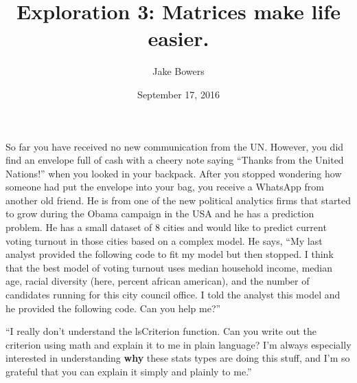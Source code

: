 \documentclass[10pt,]{article}
\title{Exploration 3: Matrices make life easier.}
\author{Jake Bowers}
\date{September 17, 2016}
\newenvironment{Shaded}{\begin{snugshade}}{\end{snugshade}}
\newcommand{\KeywordTok}[1]{\textcolor[rgb]{0.13,0.29,0.53}{\textbf{{#1}}}}
\newcommand{\DataTypeTok}[1]{\textcolor[rgb]{0.13,0.29,0.53}{{#1}}}
\newcommand{\DecValTok}[1]{\textcolor[rgb]{0.00,0.00,0.81}{{#1}}}
\newcommand{\StringTok}[1]{\textcolor[rgb]{0.31,0.60,0.02}{{#1}}}
\newcommand{\NormalTok}[1]{{#1}}
\begin{document}
\maketitle



So far you have received no new communication from the UN. However, you
did find an envelope full of cash with a cheery note saying ``Thanks
from the United Nations!'' when you looked in your backpack. After you
stopped wondering how someone had put the envelope into your bag, you
receive a WhatsApp from another old friend. He is from one of the new
political analytics firms that started to grow during the Obama campaign
in the USA and he has a prediction problem. He has a small dataset of 8
cities and would like to predict current voting turnout in those cities
based on a complex model. He says, ``My last analyst provided the
following code to fit my model but then stopped. I think that the best
model of voting turnout uses median household income, median age, racial
diversity (here, percent african american), and the number of candidates
running for this city council office. I told the analyst this model and
he provided the following code. Can you help me?''

\begin{Shaded}
\end{Shaded}

``I really don't understand the lsCriterion function. Can you write out
the criterion using math and explain it to me in plain language? I'm
always especially interested in understanding \textbf{why} these stats
types are doing this stuff, and I'm so grateful that you can explain it
simply and plainly to me.''

\begin{Shaded}
\end{Shaded}
\end{document}
